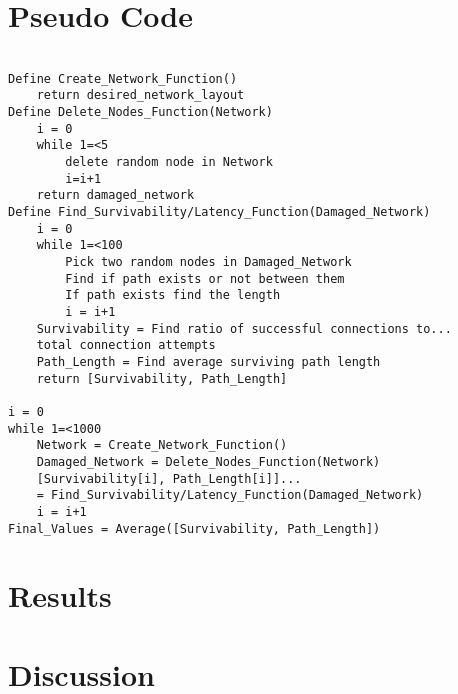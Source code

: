 \documentclass[10pt]{article}
\begin{document}
\section{Pseudo Code}
\begin{lstlisting}

Define Create_Network_Function()
	return desired_network_layout
Define Delete_Nodes_Function(Network)
	i = 0
	while 1=<5
		delete random node in Network 
		i=i+1
	return damaged_network
Define Find_Survivability/Latency_Function(Damaged_Network)
	i = 0
	while 1=<100
		Pick two random nodes in Damaged_Network
		Find if path exists or not between them
		If path exists find the length
		i = i+1
	Survivability = Find ratio of successful connections to... 
	total connection attempts
	Path_Length = Find average surviving path length
	return [Survivability, Path_Length]

i = 0
while 1=<1000
	Network = Create_Network_Function()
	Damaged_Network = Delete_Nodes_Function(Network)
	[Survivability[i], Path_Length[i]]...
	= Find_Survivability/Latency_Function(Damaged_Network)
	i = i+1
Final_Values = Average([Survivability, Path_Length])
\end{lstlisting}

\section{Results}

\section{Discussion}
\end{document}
